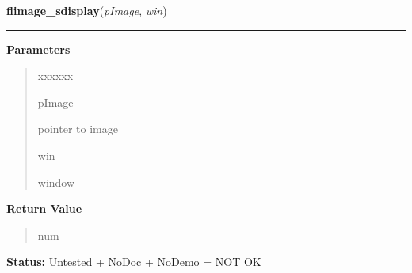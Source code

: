 \hspace{.8\funcindent}\begin{boxedminipage}{\funcwidth}

    \raggedright \textbf{flimage\_sdisplay}(\textit{pImage}, \textit{win})

    \vspace{-1.5ex}

    \rule{\textwidth}{0.5\fboxrule}
\setlength{\parskip}{2ex}
\setlength{\parskip}{1ex}
      \textbf{Parameters}
      \vspace{-1ex}

      \begin{quote}
        \begin{Ventry}{xxxxxx}

          \item[pImage]

          pointer to image

          \item[win]

          window

        \end{Ventry}

      \end{quote}

      \textbf{Return Value}
    \vspace{-1ex}

      \begin{quote}
      num

      \end{quote}

\textbf{Status:} Untested + NoDoc + NoDemo = NOT OK



    \end{boxedminipage}

    \label{xformslib:library:flimage_convert}

    \vspace{0.5ex}

